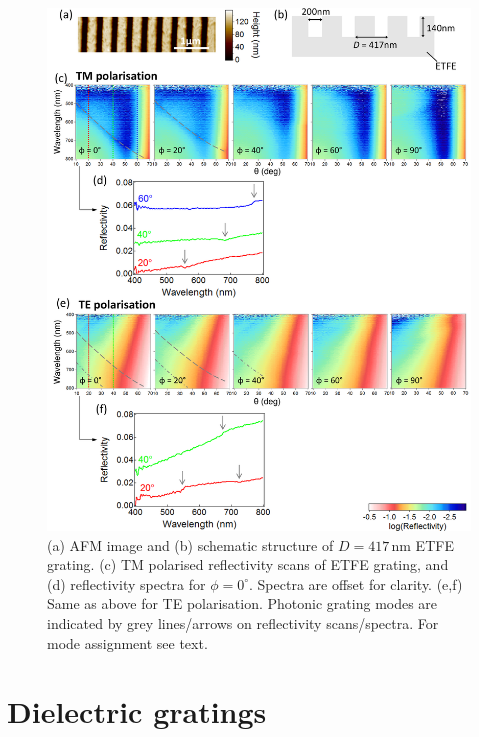 \begin{figure}[h!] 
\centering    
\includegraphics[width=\textwidth]{Fig2}
\caption[(a) AFM image and (b) schematic structure of $D=417$\,nm ETFE grating. Reflectivity measurements of ETFE grating in (c,d) TM and (e.f) TE polarisation.]{(a) AFM image and (b) schematic structure of $D=417$\,nm ETFE grating. (c) TM polarised reflectivity scans of ETFE grating, and (d) reflectivity spectra for $\phi=0^{\circ}$. Spectra are offset for clarity. (e,f) Same as above for TE polarisation. Photonic grating modes are indicated by grey lines/arrows on reflectivity scans/spectra. For mode assignment see text.}
\label{7Fig2}
\end{figure}
\section{Dielectric gratings}
